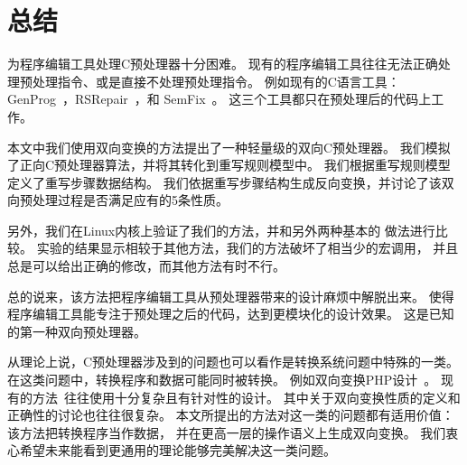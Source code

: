 \chapter{总结}
\label{sec:conclusion}

为程序编辑工具处理C预处理器十分困难。
现有的程序编辑工具往往无法正确处理预处理指令、或是直接不处理预处理指令。
例如现有的C语言工具：GenProg~\parencite{le2012genprog,le2012systematic}，RSRepair~\parencite{QiMLDW14}，和
SemFix~\parencite{nguyen2013semfix}。
这三个工具都只在预处理后的代码上工作。

本文中我们使用双向变换的方法提出了一种轻量级的双向C预处理器。
我们模拟了正向C预处理器算法，并将其转化到重写规则模型中。
我们根据重写规则模型定义了重写步骤数据结构。
我们依据重写步骤结构生成反向变换，并讨论了该双向预处理过程是否满足应有的5条性质。

另外，我们在Linux内核上验证了我们的方法，并和另外两种基本的
做法进行比较。
实验的结果显示相较于其他方法，我们的方法破坏了相当少的宏调用，
并且总是可以给出正确的修改，而其他方法有时不行。

总的说来，该方法把程序编辑工具从预处理器带来的设计麻烦中解脱出来。
使得程序编辑工具能专注于预处理之后的代码，达到更模块化的设计效果。
这是已知的第一种双向预处理器。

从理论上说，C预处理器涉及到的问题也可以看作是转换系统问题中特殊的一类。
在这类问题中，转换程序和数据可能同时被转换。
例如双向变换PHP设计~\parencite{wang2012automating}。
现有的方法~\parencite{wang2012automating}往往使用十分复杂且有针对性的设计。
其中关于双向变换性质的定义和正确性的讨论也往往很复杂。
本文所提出的方法对这一类的问题都有适用价值：该方法把转换程序当作数据，
并在更高一层的操作语义上生成双向变换。
我们衷心希望未来能看到更通用的理论能够完美解决这一类问题。



